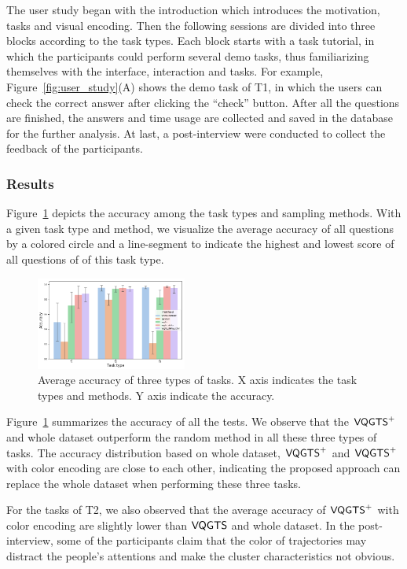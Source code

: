 The user study began with the introduction which introduces the motivation, tasks and visual encoding. Then the following sessions are divided into three blocks according to the task types. Each block starts with a task tutorial, in which the participants could perform several demo tasks, thus familiarizing themselves with the interface, interaction and tasks. For example, Figure~\ref{fig:user_study}(A) shows the demo task of T1, in which the users can check the correct answer after clicking the ``check'' button. After all the questions are finished, the answers and time usage are collected and saved in the database for the further analysis. At last, a post-interview were conducted to collect the feedback of the participants.  


\subsubsection{Results}
Figure~\ref{fig:accuracy} depicts the accuracy among the task types and sampling methods. With a given task type and method, we visualize the average accuracy of all questions by a colored circle and a line-segment to indicate the highest and lowest score of all questions of of this task type. 

\begin{figure}[t]
	\centering
	\includegraphics[width=0.44\textwidth]{pictures/user_study/accuracy.png}
	\vspace{-3mm}
	\caption{Average accuracy of three types of tasks. X axis indicates the task types and methods. Y axis indicate the accuracy.}
	\vspace{-5mm}
	\label{fig:accuracy}
\end{figure}

Figure~\ref{fig:accuracy} summarizes the accuracy of all the tests. We observe that the $\mathsf{VQGTS}^{+}$ and whole dataset outperform the random method in all these three types of tasks. The accuracy distribution based on whole dataset, $\mathsf{VQGTS}^{+}$ and $\mathsf{VQGTS}^{+}$ with color encoding are close to each other, indicating the proposed approach can replace the whole dataset when performing these three tasks. 

For the tasks of T2, we also observed that the average accuracy of $\mathsf{VQGTS}^{+}$ with color encoding are slightly lower than $\mathsf{VQGTS}$ and whole dataset. In the post-interview, some of the participants claim that the color of trajectories may distract the people's attentions and make the cluster characteristics not obvious. 





